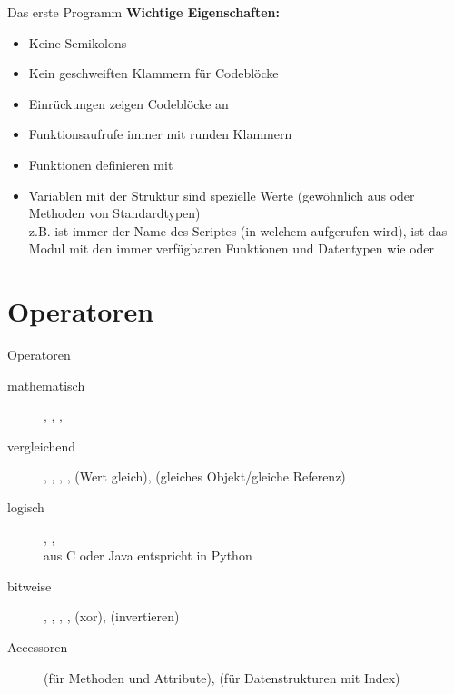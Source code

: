 \begin{frame}[fragile]{Das erste Programm}
	\textbf{Wichtige Eigenschaften:}
	\begin{itemize}
	    \item Keine Semikolons
	    \item Kein geschweiften Klammern für Codeblöcke
	    \item Einrückungen zeigen Codeblöcke an
	    \item Funktionsaufrufe immer mit runden Klammern
	    \item Funktionen definieren mit 
	    \item Variablen mit der Struktur  sind spezielle Werte (gewöhnlich aus  oder Methoden von Standardtypen)\\
	      z.B.  ist immer der Name des Scriptes (in welchem  aufgerufen wird),  
	       ist das Modul mit den immer verfügbaren Funktionen und Datentypen wie  oder 
	\end{itemize}
\end{frame}


\section{Operatoren}
\begin{frame}[fragile]{Operatoren}
	\begin{description}
	    \item[mathematisch] \codeline{+}, \codeline{-}, \codeline{*}, \codeline{/} 
	    \item[vergleichend] \codeline{<}, \codeline{>}, \codeline{<=}, \codeline{>=}, \codeline{==} (Wert gleich),  (gleiches Objekt/gleiche Referenz)
	    \item[logisch] , , \\  aus C oder Java entspricht  in Python
	    \item[bitweise] \codeline{&}, \codeline{\|}, \codeline{\<\<}, \codeline{\>\>}, \codeline{\^} (xor), \codeline{\~} (invertieren)
	    \item[Accessoren]  (für Methoden und Attribute), \codeline{[]} (für Datenstrukturen mit Index)
	\end{description}
\end{frame}


